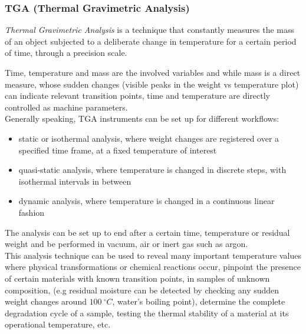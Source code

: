 \documentclass{article}
\begin{document}
        \subsubsection{TGA (Thermal Gravimetric Analysis)\label{TGA_Analysis}}
        
        \textit{Thermal Gravimetric Analysis} is a technique that constantly measures the mass of an object subjected to a deliberate 
        change in temperature for a certain period of time, through a precision scale. 

        Time, temperature and mass are the involved variables and while mass is a direct measure, whose sudden changes (visible peaks
        in the weight vs temperature plot) can indicate relevant transition points, time and temperature are directly controlled 
        as machine parameters. \\ 

        Generally speaking, TGA instruments can be set up for different workflows: 

                \begin{itemize}
                    \item static or isothermal analysis, where weight changes are registered over a specified time frame, 
                    at a fixed temperature of interest
                    \item quasi-static analysis, where temperature is changed in discrete steps, with isothermal intervals in between 
                    \item dynamic analysis, where temperature is changed in a continuous linear fashion
                \end{itemize}

            The analysis can be set up to end after a certain time, temperature or residual weight and be performed 
            in vacuum, air or inert gas such as argon. \\

        This analysis technique can be used to reveal many important temperature values where physical transformations or chemical 
        reactions occur, pinpoint the presence of certain materials with known transition points, in samples of unknown composition, 
        (e.g residual moisture can be detected by checking any sudden weight changes around $100 \ ^{\circ}C $, water's boiling point), 
        determine the complete degradation cycle of a sample, testing the thermal stability of a material at its operational temperature, etc. \\ 
\end{document}
